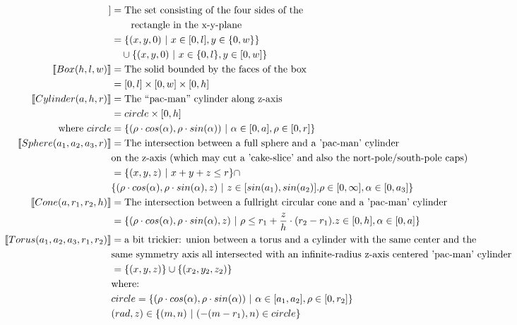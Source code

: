 \documentclass[11pt,draft,a4paper]{article}%
\newcommand{\setsep}[2]{\{#1~|~#2\}}
\newcommand{\leftsem}{[\![} %
\newcommand{\rightsem}{]\!]} %
\newcommand{\setsem}[1]{\leftsem #1 \rightsem} %
\begin{document}
\begin{align}
\setsem{Rectangle(w, l)} & = \text{The set consisting of the four sides of the }\notag\\
 & \qquad \text{rectangle in the x-y-plane}\notag\\
 & = \setsep{(x,y,0)}{x\in[0,l], y\in\{0,w\}}\notag\\
 & \quad \cup \setsep{(x,y,0)}{x\in\{0,l\}, y\in[0,w]}\\
\setsem{Box(h, l, w)} & = \text{The solid bounded by the faces of the box}\notag\\
 & = [0,l]\times[0,w]\times[0,h]\\
\setsem{Cylinder(a, h, r)} & = \text{The ``pac-man'' cylinder along z-axis}\notag\\
 & = circle\times[0,h]\\
 \text{where}~ circle &=\setsep{(\rho\cdot cos(\alpha),\rho\cdot sin(\alpha))}{\alpha \in [0,a], \rho \in [0,r]}\notag\\
\setsem{Sphere(a_1, a_2, a_3, r)} & = \text{The intersection between a full sphere and a 'pac-man' cylinder}\notag\\ 
& \text {on the z-axis (which may cut a 'cake-slice' and also the nort-pole/south-pole caps)}\notag\\
& = \setsep{(x,y,z)}{x + y + z \leq r} \cap \notag\\
& \setsep{(\rho\cdot cos(\alpha),\rho\cdot sin(\alpha),z)}{z \in [sin(a_1),sin(a_2)]. \rho \in [0, \infty], \alpha \in [0, a_3]}\\
\setsem{Cone(a, r_1, r_2, h)} & = \text{The intersection between a fullright circular cone and a 'pac-man' cylinder}\notag\\
& = \setsep{(\rho \cdot cos(\alpha), \rho \cdot sin(\alpha), z)}{\rho \leq r_1 + {{z}\over{h}} \cdot (r_2 - r_1). z \in [0,h],\alpha \in [0, a]} \\
\setsem{Torus(a_1, a_2, a_3, r_1, r_2)}  & = \text{a bit trickier: union between a torus and a cylinder with the same center and the}\notag\\
& \text {same symmetry axis all intersected with an infinite-radius z-axis centered 'pac-man' cylinder}\notag\\
& = \{(x,y,z)\} \cup \{(x_2,y_2,z_2)\}\notag\\
& \text{where:}\notag\\
& circle = \setsep{(\rho\cdot cos(\alpha), \rho\cdot sin(\alpha))}{\alpha \in [a_1, a_2], \rho \in [0,r_2]}\notag\\
& (rad, z) \in \setsep{(m,n)}{(-(m-r_1), n)\in circle}\notag\\

\end{align}
\end{document}
